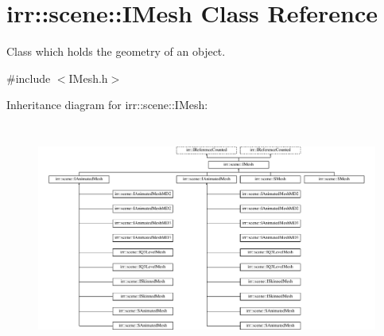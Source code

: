 \hypertarget{classirr_1_1scene_1_1IMesh}{}\section{irr\+:\+:scene\+:\+:I\+Mesh Class Reference}
\label{classirr_1_1scene_1_1IMesh}


Class which holds the geometry of an object.  




{\ttfamily \#include $<$I\+Mesh.\+h$>$}

Inheritance diagram for irr\+:\+:scene\+:\+:I\+Mesh\+:\begin{figure}[H]
\begin{center}
\leavevmode
\includegraphics[height=7.583333cm]{classirr_1_1scene_1_1IMesh}
\end{center}
\end{figure}
